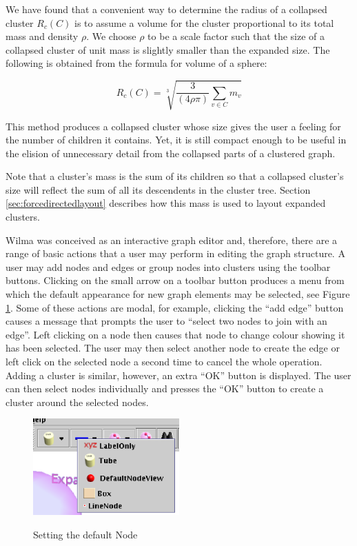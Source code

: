 \documentclass[runningheads]{cl2emult}
\begin{document}
We have found that a convenient way to determine the radius of a collapsed cluster
$R_c(C)$ is to assume a volume for the cluster proportional to its
total mass and density $\rho$.  We choose $\rho$ to be a scale factor
such that the size of a collapsed cluster of unit mass is slightly
smaller than the expanded size.  The following is obtained from the formula for volume of a
sphere:

\[
R_c(C) = \sqrt[3]{\frac{3}{(4\rho\pi)}\sum_{v \in C}m_v}
\]

This method produces a collapsed cluster whose size gives the user a
feeling for the number of children it contains.  Yet, it is still
compact enough to be useful in the elision of unnecessary detail from
the collapsed parts of a clustered graph.

Note that a cluster's mass is the sum of its children so that a
collapsed cluster's size will reflect the sum of all its descendents
in the cluster tree.  Section \ref{sec:forcedirectedlayout} describes
how this mass is used to layout expanded clusters.

Wilma was conceived as an interactive graph editor and, therefore, there
are a range of basic actions that a user may perform in editing the
graph structure.  A user may add nodes and edges or group nodes into
clusters using the toolbar buttons.  Clicking on the small arrow on a
toolbar button produces a menu from which the default appearance for
new 
graph elements may be selected, see Figure
\ref{fig-defaultnode}.
Some of these actions are modal, for example, clicking the ``add
edge'' button causes a message that prompts the user to ``select two
nodes to join with an edge''.  Left clicking on a node then causes that node
to change colour showing it has been selected.  The user may then
select another node to create the edge or left click on the selected node a
second time to cancel the whole operation.  Adding a cluster is
similar, however, an extra ``OK'' button is displayed.  The user can
then select nodes individually and presses the ``OK'' button to create
a cluster around the selected nodes.
\begin{figure}
\begin{center}
  \label{fig-defaultnode}
  \includegraphics[width=0.5\textwidth]{figures/defaultnode.eps}
  \caption{Setting the default Node}
\end{center}
\end{figure}
\end{document}
